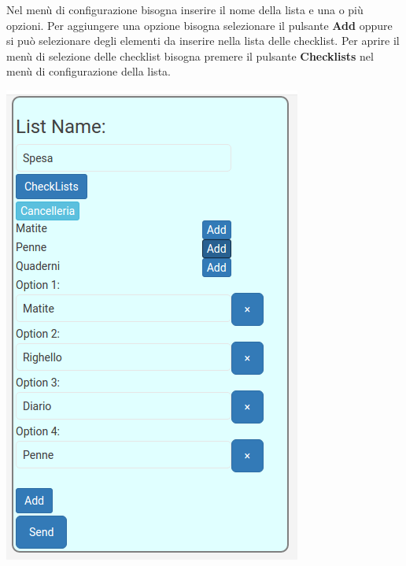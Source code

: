 \begin{flushleft}
Nel menù di configurazione bisogna inserire il nome della lista e una o più opzioni.
Per aggiungere una opzione bisogna selezionare il pulsante \textbf{Add} oppure si può selezionare degli elementi da inserire nella lista delle checklist.
Per aprire il menù di selezione delle checklist bisogna premere il pulsante \textbf{Checklists} nel menù di configurazione della lista.\\
\begin{center}
\includegraphics[scale=0.75]{img/list_checklist1.png}
\end{center}


\end{flushleft}

